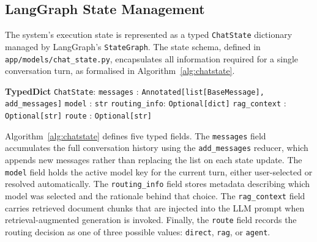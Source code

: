 \documentclass[12pt,a4paper]{article}
\newcommand{\kw}[1]{\textbf{#1}}
\newcommand{\ty}[1]{\texttt{#1}}
\begin{document}
\subsection{LangGraph State Management}
\label{subsec:state_management}

The system's execution state is represented as a typed \texttt{ChatState} dictionary managed by LangGraph's \texttt{StateGraph}. The state schema, defined in \texttt{app/models/chat\_state.py}, encapsulates all information required for a single conversation turn, as formalised in Algorithm~\ref{alg:chatstate}.

\begin{algorithm}[H]
\caption{ChatState TypedDict definition managing conversation context and routing metadata.}
\label{alg:chatstate}
\begin{algorithmic}[1]
  \State \kw{TypedDict} \ty{ChatState}:
  \State \hspace{\algorithmicindent}
         \ty{messages}     : \ty{Annotated[list[BaseMessage], add\_messages]}
  \State \hspace{\algorithmicindent}
         \ty{model}        : \ty{str}
  \State \hspace{\algorithmicindent}
         \ty{routing\_info}: \ty{Optional[dict]}
  \State \hspace{\algorithmicindent}
         \ty{rag\_context} : \ty{Optional[str]}
  \State \hspace{\algorithmicindent}
         \ty{route}        : \ty{Optional[str]}
\end{algorithmic}
\end{algorithm}

Algorithm~\ref{alg:chatstate} defines five typed fields. The \ty{messages} field accumulates the full conversation history using the \texttt{add\_messages} reducer, which appends new messages rather than replacing the list on each state update. The \ty{model} field holds the active model key for the current turn, either user-selected or resolved automatically. The \ty{routing\_info} field stores metadata describing which model was selected and the rationale behind that choice. The \ty{rag\_context} field carries retrieved document chunks that are injected into the LLM prompt when retrieval-augmented generation is invoked. Finally, the \ty{route} field records the routing decision as one of three possible values: \texttt{direct}, \texttt{rag}, or \texttt{agent}.
\end{document}
